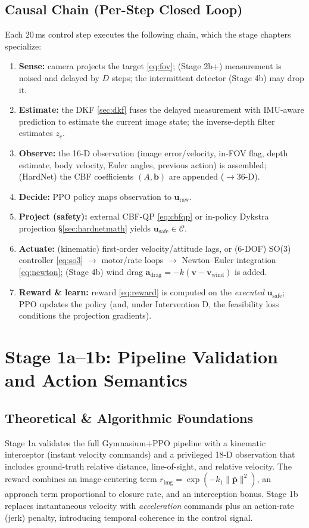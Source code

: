 \documentclass[11pt]{article}
\begin{document}
\subsection{Causal Chain (Per-Step Closed Loop)}
\label{sec:causal}
Each $20\,$ms control step executes the following chain, which the stage
chapters specialize:
\begin{enumerate}[nosep]
\item \textbf{Sense:} camera projects the target \eqref{eq:fov}; (Stage 2b+)
measurement is noised and delayed by $D$ steps; the intermittent detector
(Stage 4b) may drop it.
\item \textbf{Estimate:} the DKF \eqref{sec:dkf} fuses the delayed measurement
with IMU-aware prediction to estimate the current image state; the inverse-depth
filter estimates $z_c$.
\item \textbf{Observe:} the 16-D observation (image error/velocity, in-FOV flag,
depth estimate, body velocity, Euler angles, previous action) is assembled;
(HardNet) the CBF coefficients $(A,\mathbf b)$ are appended ($\rightarrow$36-D).
\item \textbf{Decide:} PPO policy maps observation to $\mathbf u_\text{raw}$.
\item \textbf{Project (safety):} external CBF-QP \eqref{eq:cbfqp} or in-policy
Dykstra projection \S\ref{sec:hardnetmath} yields $\mathbf u_\text{safe}\in\mathcal C$.
\item \textbf{Actuate:} (kinematic) first-order velocity/attitude lags, or
(6-DOF) SO(3) controller \eqref{eq:so3} $\rightarrow$ motor/rate loops
$\rightarrow$ Newton--Euler integration \eqref{eq:newton}; (Stage 4b) wind drag
$\mathbf a_\text{drag}=-k(\mathbf v-\mathbf v_\text{wind})$ is added.
\item \textbf{Reward \& learn:} reward \eqref{eq:reward} is computed on the
\emph{executed} $\mathbf u_\text{safe}$; PPO updates the policy (and, under
Intervention D, the feasibility loss conditions the projection gradients).
\end{enumerate}

\section{Stage 1a--1b: Pipeline Validation and Action Semantics}
\subsection{Theoretical \& Algorithmic Foundations}
Stage 1a validates the full Gymnasium+PPO pipeline with a kinematic
interceptor (instant velocity commands) and a privileged 18-D observation
that includes ground-truth relative distance, line-of-sight, and relative
velocity. The reward combines an image-centering term
$r_\text{img}=\exp(-k_1\lVert\bar{\mathbf p}\rVert^2)$, an approach term
proportional to closure rate, and an interception bonus. Stage 1b replaces
instantaneous velocity with \emph{acceleration} commands plus an action-rate
(jerk) penalty, introducing temporal coherence in the control signal.
\end{document}
